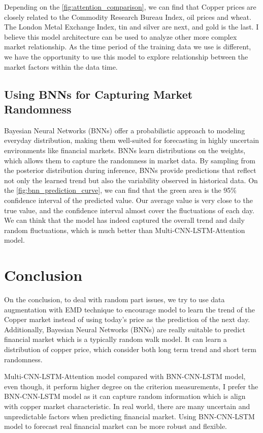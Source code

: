 \documentclass[final-report]{report-template}
\begin{document}
Depending on the \autoref{fig:attention_comparison}, we can find that Copper prices are closely related to the Commodity Research Bureau Index, oil prices and wheat. The London Metal Exchange Index, tin and silver are next, and gold is the last. I believe this model architecture can be used to analyze other more complex market relationship. As the time period of the training data we use is different, we have the opportunity to use this model to explore relationship between the market factors within the data time.

\subsection{Using BNNs for Capturing Market Randomness}
Bayesian Neural Networks (BNNs) offer a probabilistic approach to modeling everyday distribution, making them well-suited for forecasting in highly uncertain environments like financial markets. BNNs learn distributions on the weights, which allows them to capture the randomness in market data. By sampling from the posterior distribution during inference, BNNs provide predictions that reflect not only the learned trend but also the variability observed in historical data. On the \autoref{fig:bnn_prediction_curve}, we can find that the green area is the 95\% confidence interval of the predicted value. Our average value is very close to the true value, and the confidence interval almost cover the fluctuations of each day. We can think that the model has indeed captured the overall trend and daily random fluctuations, which is much better than Multi-CNN-LSTM-Attention model.

\section{Conclusion}

On the conclusion, to deal with random part issues, we try to use data augmentation with EMD technique to encourage model to learn the trend of the Copper market instead of using today's price as the prediction of the next day. Additionally, Bayesian Neural Networks (BNNs) are really suitable to predict financial market which is a typically random walk model.  It can learn a distribution of copper price, which consider both long term trend and short term randomness.

Multi-CNN-LSTM-Attention model compared with BNN-CNN-LSTM model, even though, it perform higher degree on the criterion measurements, I prefer the BNN-CNN-LSTM model as it can capture random information which is align with copper market characteristic. In real world, there are many uncertain and unpredictable factors when predicting financial market. Using BNN-CNN-LSTM model to forecast real financial market can be more robust and flexible. 
\newpage


\end{document}
